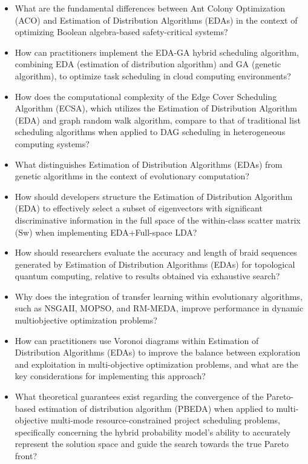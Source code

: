 \begin{itemize}[noitemsep]
    \item What are the fundamental differences between Ant Colony Optimization (ACO) and Estimation of Distribution Algorithms (EDAs) in the context of optimizing Boolean algebra-based safety-critical systems?
    \item How can practitioners implement the EDA-GA hybrid scheduling algorithm, combining EDA (estimation of distribution algorithm) and GA (genetic algorithm), to optimize task scheduling in cloud computing environments?
    \item How does the computational complexity of the Edge Cover Scheduling Algorithm (ECSA), which utilizes the Estimation of Distribution Algorithm (EDA) and graph random walk algorithm, compare to that of traditional list scheduling algorithms when applied to DAG scheduling in heterogeneous computing systems?
    \item What distinguishes Estimation of Distribution Algorithms (EDAs) from genetic algorithms in the context of evolutionary computation?
    \item How should developers structure the Estimation of Distribution Algorithm (EDA) to effectively select a subset of eigenvectors with significant discriminative information in the full space of the within-class scatter matrix (Sw) when implementing EDA+Full-space LDA?
    \item How should researchers evaluate the accuracy and length of braid sequences generated by Estimation of Distribution Algorithms (EDAs) for topological quantum computing, relative to results obtained via exhaustive search?
    \item Why does the integration of transfer learning within evolutionary algorithms, such as NSGAII, MOPSO, and RM-MEDA, improve performance in dynamic multiobjective optimization problems?
    \item How can practitioners use Voronoi diagrams within Estimation of Distribution Algorithms (EDAs) to improve the balance between exploration and exploitation in multi-objective optimization problems, and what are the key considerations for implementing this approach?
    \item What theoretical guarantees exist regarding the convergence of the Pareto-based estimation of distribution algorithm (PBEDA) when applied to multi-objective multi-mode resource-constrained project scheduling problems, specifically concerning the hybrid probability model's ability to accurately represent the solution space and guide the search towards the true Pareto front?

\end{itemize}
